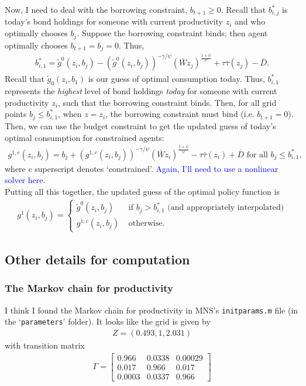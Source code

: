 \documentclass[12pt]{article}
\begin{document}
Now, I need to deal with the borrowing constraint, $b_{t+1} \geq 0$. Recall that $b^*_{i,j}$ is today's bond holdings for someone with current productivity $z_i$ and who optimally chooses $b_j$. Suppose the borrowing constraint binds;  then agent optimally chooses $b_{t+1} = b_j =0$. Thus,
\begin{align*}
b^*_{i,1} = \tilde g^0(z_i,b_j) - \left(\tilde g^0(z_i,b_j)\right)^{-\gamma/\psi} (\bar Wz_j)^{\frac{1+\psi}{\psi}} + \tau\bar\tau(z_j) - \bar D.
\end{align*}
Recall that $\tilde g_0(z_i,b_1)$ is our guess of optimal consumption today. Thus, $b^*_{i,1}$ represents the \textit{highest} level of bond holdings \textit{today} for someone with current productivity $z_i$, such that the borrowing constraint binds. Then, for all grid points $b_j \leq b^*_{i,1}$, when $z=z_i$, the borrowing constraint must bind (i.e. $b_{t+1}=0$). Then, we can use the budget constraint to get the updated guess of today's optimal consumption for constrained agents:
\begin{align*}
g^{1,c}(z_i,b_j) = b_j + \left(g^{1,c}(z_i,b_j)\right)^{-\gamma/\psi} (\bar Wz_i)^{\frac{1+\psi}{\psi}} - \tau\bar\tau(z_i) +\bar D \text{ for all } b_j \leq b^*_{i,1},
\end{align*}
where $c$ superscript denotes `constrained'. \textcolor{blue}{Again, I'll need to use a nonlinear solver here.}\\

Putting all this together, the updated guess of the optimal policy function is
\begin{align*}
g^1(z_i,b_j) = 
\begin{cases}
\tilde g^0(z_i,b_j) &\text{ if } b_j > b^*_{i,1} \text{ (and appropriately interpolated)}\\
g^{1,c}(z_i,b_j)&\text{ otherwise.}
\end{cases}
\end{align*}

\subsection{Other details for computation}
\subsubsection{The Markov chain for productivity}
I think I found the Markov chain for productivity in MNS's \verb|initparams.m| file (in the `\verb|parameters|' folder). It looks like the grid is given by
\begin{align*}
Z = (0.493, 1, 2.031)
\end{align*}
with transition matrix
\begin{align*}
\Gamma = 
\begin{bmatrix}
0.966 &	0.0338 &	0.00029 \\
0.017&	0.966& 	0.017 \\
0.0003 &	0.0337 &	0.966
\end{bmatrix}
\end{align*}
\end{document}
